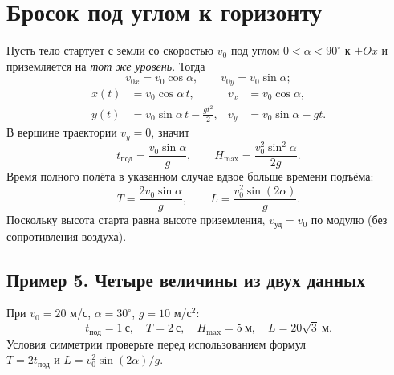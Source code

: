 \documentclass[a4paper,12pt]{article}
\begin{document}
\section{Бросок под углом к горизонту}
Пусть тело стартует с земли со скоростью $v_0$ под углом $0<\alpha<90^\circ$ к $+Ox$ и приземляется на \textit{тот же уровень}. Тогда
\[
 v_{0x}=v_0\cos\alpha,\qquad v_{0y}=v_0\sin\alpha;
\]
\[
 \begin{aligned}
 x(t)&=v_0\cos\alpha\,t, &v_x&=v_0\cos\alpha,\\
 y(t)&=v_0\sin\alpha\,t-\frac{gt^2}{2},
 &v_y&=v_0\sin\alpha-gt.
 \end{aligned}
\]
В вершине траектории $v_y=0$, значит
\[
 t_{\text{под}}=\frac{v_0\sin\alpha}{g},\qquad
 \boxed{H_{\max}=\frac{v_0^2\sin^2\alpha}{2g}}.
\]
Время полного полёта в указанном случае вдвое больше времени подъёма:
\[
 \boxed{T=\frac{2v_0\sin\alpha}{g}},\qquad
 \boxed{L=\frac{v_0^2\sin(2\alpha)}{g}}.
\]
Поскольку высота старта равна высоте приземления, $v_{\text{уд}}=v_0$ по модулю (без сопротивления воздуха).

\subsection{Пример 5. Четыре величины из двух данных}
При $v_0=20$ м/с, $\alpha=30^\circ$, $g=10$ м/с$^2$:
\[
 t_{\text{под}}=1\ \text{с},\quad T=2\ \text{с},\quad
 H_{\max}=5\ \text{м},\quad L=20\sqrt3\ \text{м}.
\]
Условия симметрии проверьте перед использованием формул\\
$T=2t_{\text{под}}$ и $L=v_0^2\sin(2\alpha)/g$.
\end{document}

